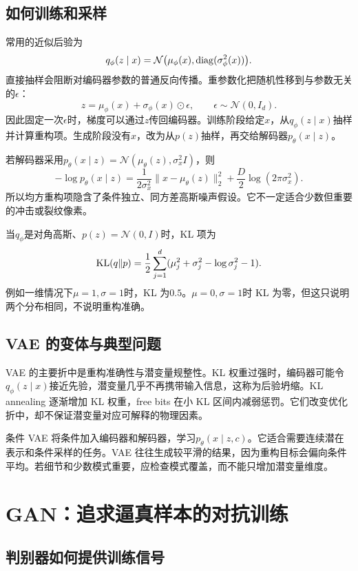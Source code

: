 \subsection{如何训练和采样}

常用的近似后验为
\[
q_{\phi}(z\mid x)=\mathcal N\bigl(\mu_{\phi}(x),\operatorname{diag}(\sigma_{\phi}^2(x))\bigr).
\]
直接抽样会阻断对编码器参数的普通反向传播。重参数化把随机性移到与参数无关的$\epsilon$：
\begin{equation}
z=\mu_{\phi}(x)+\sigma_{\phi}(x)\odot\epsilon,
\qquad \epsilon\sim\mathcal N(0,I_d).
\end{equation}
因此固定一次$\epsilon$时，梯度可以通过$z$传回编码器。训练阶段给定$x$，从$q_{\phi}(z\mid x)$抽样并计算重构项。生成阶段没有$x$，改为从$p(z)$抽样，再交给解码器$p_{\theta}(x\mid z)$。

若解码器采用$p_{\theta}(x\mid z)=\mathcal N(\mu_{\theta}(z),\sigma_x^2I)$，则
\[
-\log p_{\theta}(x\mid z)=\frac{1}{2\sigma_x^2}\|x-\mu_{\theta}(z)\|_2^2+\frac D2\log(2\pi\sigma_x^2).
\]
所以均方重构项隐含了条件独立、同方差高斯噪声假设。它不一定适合少数但重要的冲击或裂纹像素。

当$q_{\phi}$是对角高斯、$p(z)=\mathcal N(0,I)$时，KL 项为
\[
\operatorname{KL}(q\|p)=\frac12\sum_{j=1}^{d}(\mu_j^2+\sigma_j^2-\log\sigma_j^2-1).
\]
例如一维情况下$\mu=1,\sigma=1$时，KL 为$0.5$。$\mu=0,\sigma=1$时 KL 为零，但这只说明两个分布相同，不说明重构准确。

\subsection{VAE 的变体与典型问题}

VAE 的主要折中是重构准确性与潜变量规整性。KL 权重过强时，编码器可能令$q_{\phi}(z\mid x)$接近先验，潜变量几乎不再携带输入信息，这称为后验坍缩。KL annealing 逐渐增加 KL 权重，free bits 在小 KL 区间内减弱惩罚。它们改变优化折中，却不保证潜变量对应可解释的物理因素。

条件 VAE 将条件加入编码器和解码器，学习$p_{\theta}(x\mid z,c)$。它适合需要连续潜在表示和条件采样的任务。VAE 往往生成较平滑的结果，因为重构目标会偏向条件平均。若细节和少数模式重要，应检查模式覆盖，而不能只增加潜变量维度。

\section{GAN：追求逼真样本的对抗训练}

\subsection{判别器如何提供训练信号}

